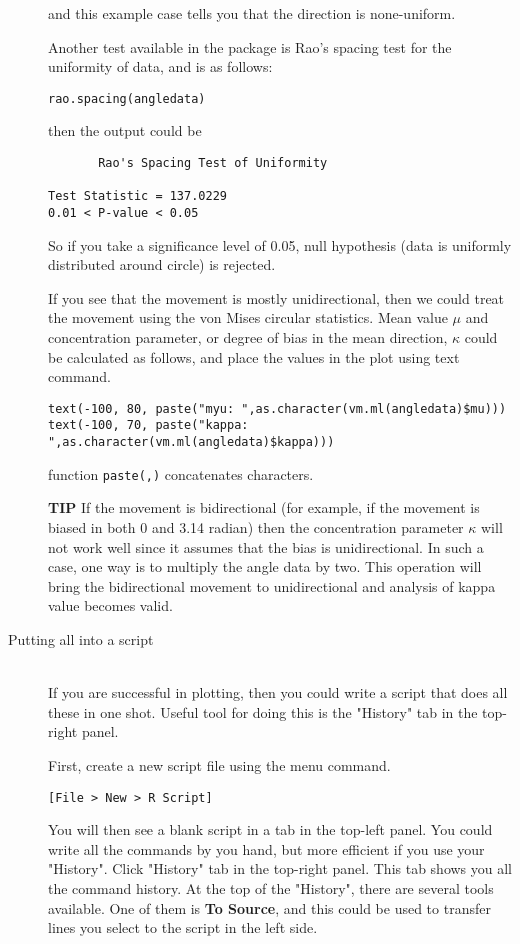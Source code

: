 \documentclass[11pnt]{article}
\begin{document}
\begin{description}
and this example case tells you that the direction is none-uniform.

Another test available in the package is Rao's spacing test for the uniformity of data, and is as follows:

\verb"rao.spacing(angledata)"

then the output could be

\begin{verbatim}
       Rao's Spacing Test of Uniformity 
 
Test Statistic = 137.0229 
0.01 < P-value < 0.05  
\end{verbatim}

So if you take a significance level of 0.05, null hypothesis (data is uniformly distributed around circle) is rejected. 

If you see that the movement is mostly unidirectional, then we could treat the movement using the von Mises circular statistics. Mean value \(\mu\) and concentration parameter, or degree of bias in the mean direction, \(\kappa\) could be calculated as follows, and place the values in the plot using text command.  

\begin{verbatim}
text(-100, 80, paste("myu: ",as.character(vm.ml(angledata)$mu)))
text(-100, 70, paste("kappa: ",as.character(vm.ml(angledata)$kappa)))
\end{verbatim}

function \verb"paste(,)" concatenates characters. 

\textbf{TIP} If the movement is bidirectional (for example, if the movement is biased in both 0 and 3.14 radian) then the concentration parameter \(\kappa\) will not work well since it assumes that the bias is unidirectional. In such a case, one way is to multiply the angle data by two. This operation will bring the bidirectional movement to unidirectional and analysis of kappa value becomes valid.  

\item[Putting all into a script]\hfill\\

If you are successful in plotting, then you could write a script that does all these in one shot. Useful tool for doing this is the "History" tab in the top-right panel. 

First, create a new script file using the menu command.

\verb"[File > New > R Script]"

You will then see a blank script in a tab in the top-left panel. You could write all the commands by you hand, but more efficient if you use your "History". Click "History" tab in the top-right panel. This tab shows you all the command history. At the top of the "History", there are several tools available. One of them is \textbf{To Source}, and this could be used to transfer lines you select to the script in the left side. 


\end{description}
\end{document}
